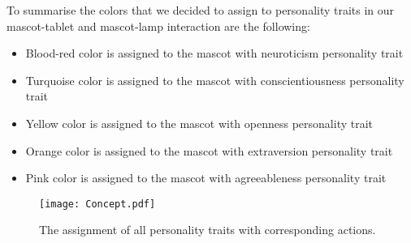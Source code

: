 To summarise the colors that we decided to assign to personality traits in our
mascot-tablet and mascot-lamp interaction are the following:
\begin{itemize}
\item Blood-red color is assigned to the mascot with neuroticism personality trait
\item Turquoise color is assigned to the mascot with conscientiousness personality trait
\item Yellow color is assigned to the mascot with openness personality trait
\item Orange color is assigned to the mascot with extraversion personality trait
\item Pink color is assigned to the mascot with agreeableness personality trait
\end{itemize}

\begin{figure}[hbt!]
    \centering
    \texttt{[image: Concept.pdf]}
    \caption{The assignment of all personality traits with corresponding actions.}
    \label{fig:Concept}
\end{figure}